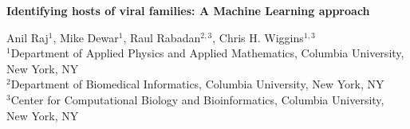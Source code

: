 \documentclass[11pt,amsmath,amssymb,amstex]{article}
\begin{document}
\begin{center}
\pagestyle{empty}
\textbf{Identifying hosts of viral families: A Machine Learning approach}

\small{
Anil Raj$^{1}$, Mike Dewar$^{1}$, Raul Rabadan$^{2,3}$, Chris H. Wiggins$^{1,3}$\\
$^{1}$Department of Applied Physics and Applied Mathematics, Columbia University, New York, NY\\
$^{2}$Department of Biomedical Informatics, Columbia University, New York, NY\\
$^{3}$Center for Computational Biology and Bioinformatics, Columbia University, New York, NY\\
}
\end{center}



%
%
\end{document}
